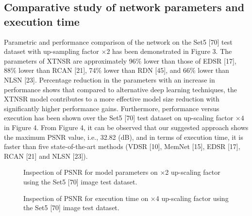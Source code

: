 \documentclass[twocolumn]{svjour3}          %
\begin{document}
\subsection{Comparative study of network parameters and execution time}

Parametric and performance comparison of the network on the Set5 [70] test dataset with up-sampling factor $\times 2$  has been demonstrated in Figure 3. The parameters of XTNSR are approximately 96\% lower than those of EDSR [17], 88\% lower than RCAN [21], 74\% lower than RDN [45], and 66\% lower than NLSN [23]. Percentage reduction in the parameters with an increase in performance shows that compared to alternative deep learning techniques, the XTNSR model contributes to a more effective model size reduction with significantly higher performance gains.
Furthermore, performance versus execution has been shown over the Set5 [70] test dataset on up-scaling factor $\times 4$  in Figure 4. From Figure 4, it can be observed that our suggested approach shows the maximum PSNR value, i.e., 32.82 (dB), and in terms of execution time, it is faster than five state-of-the-art methods (VDSR [10], MemNet [15], EDSR [17], RCAN [21] and NLSN [23]).

\begin{figure}
  \centering
   \caption {Inspection of PSNR for model parameters on ×2 up-scaling factor using the Set5 [70] image test dataset.}
    \label{fig:6}
\end{figure}

\begin{figure}
  \centering
   \caption {Inspection of PSNR for execution time on ×4 up-scaling factor using the Set5 [70] image test dataset.}
    \label{fig:7}
\end{figure}
\end{document}
